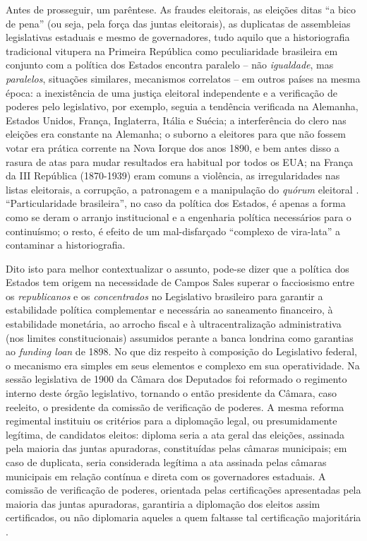 Antes de prosseguir, um parêntese. As fraudes eleitorais, as eleições ditas ``a bico de pena'' (ou seja, pela força das juntas eleitorais), as duplicatas de assembleias legislativas estaduais e mesmo de governadores, tudo aquilo que a historiografia tradicional vitupera na Primeira República como peculiaridade brasileira em conjunto com a política dos Estados encontra paralelo -- não \textit{igualdade}, mas \textit{paralelos}, situações similares, mecanismos correlatos -- em outros países na mesma época: a inexistência de uma justiça eleitoral independente e a verificação de poderes pelo legislativo, por exemplo, seguia a tendência verificada na Alemanha, Estados Unidos, França, Inglaterra, Itália e Suécia; a interferência do clero nas eleições era constante na Alemanha; o suborno a eleitores para que não fossem votar era prática corrente na Nova Iorque dos anos 1890, e bem antes disso a rasura de atas para mudar resultados era habitual por todos os EUA; na França da III República (1870-1939) eram comuns a violência, as irregularidades nas listas eleitorais, a corrupção, a patronagem e a manipulação do \textit{quórum} eleitoral \cite{riccizulini_fraude_2012}. ``Particularidade brasileira'', no caso da política dos Estados, é apenas a forma como se deram o arranjo institucional e a engenharia política necessários para o continuísmo; o resto, é efeito de um mal-disfarçado ``complexo de vira-lata'' \cite{rodrigues_viralatas_1993} a contaminar a historiografia.

Dito isto para melhor contextualizar o assunto, pode-se dizer que a política dos Estados tem origem na necessidade de Campos Sales superar o facciosismo entre os \textit{republicanos} e os \textit{concentrados} no Legislativo brasileiro para garantir a estabilidade política complementar e necessária ao saneamento financeiro, à estabilidade monetária, ao arrocho fiscal e à ultracentralização administrativa (nos limites constitucionais) assumidos perante a banca londrina como garantias ao \textit{funding loan} de 1898. No que diz respeito à composição do Legislativo federal, o mecanismo era simples em seus elementos e complexo em sua operatividade. Na sessão legislativa de 1900 da Câmara dos Deputados foi reformado o regimento interno deste órgão legislativo, tornando o então presidente da Câmara, caso reeleito, o presidente da comissão de verificação de poderes. A mesma reforma regimental instituiu os critérios para a diplomação legal, ou presumidamente legítima, de candidatos eleitos: diploma seria a ata geral das eleições, assinada pela maioria das juntas apuradoras, constituídas pelas câmaras municipais; em caso de duplicata, seria considerada legítima a ata assinada pelas câmaras municipais em relação contínua e direta com os governadores estaduais. A comissão de verificação de poderes, orientada pelas certificações apresentadas pela maioria das juntas apuradoras, garantiria a diplomação dos eleitos assim certificados, ou não diplomaria aqueles a quem faltasse tal certificação majoritária \cite{carone_textcontext_1973, carone_evolucao_1977, silva_opodercivil_1975}.


